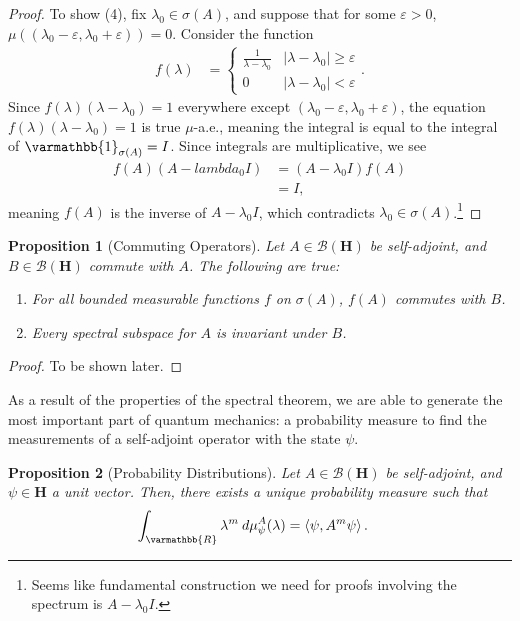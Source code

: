 \documentclass[12pt]{extarticle}
\newcommand{\R}{\varmathbb{R}}
\newcommand{\iprod}[2]{\left\langle #1,#2\right\rangle}
\theoremstyle{plain}
\newtheorem*{proposition}{Proposition}%
\theoremstyle{definition}
\theoremstyle{remark}
\begin{document}
\begin{proof}
    To show (4), fix $\lambda_0\in \sigma(A)$, and suppose that for some $\varepsilon > 0$, $\mu\left((\lambda_0 - \varepsilon, \lambda_0 + \varepsilon)\right) = 0$. Consider the function
    \begin{align*}
      f(\lambda) &= \begin{cases}
        \frac{1}{\lambda - \lambda_0} & \left\vert \lambda - \lambda_0 \right\vert \geq \varepsilon\\
        0 & \left\vert \lambda - \lambda_0 \right\vert < \varepsilon
      \end{cases}.
    \end{align*}
    Since $f(\lambda)\left(\lambda - \lambda_0\right) = 1$ everywhere except $(\lambda_0 - \varepsilon,\lambda_0 + \varepsilon)$, the equation $f(\lambda)\left(\lambda - \lambda_0\right) = 1$ is true $\mu$-a.e., meaning the integral is equal to the integral of $\varmathbb{1}_{\sigma(A)} = I$. Since integrals are multiplicative, we see
    \begin{align*}
      f(A)\left(A - lambda_0 I\right) &= \left(A - \lambda_0 I\right)f(A)\\
                                      &= I,
    \end{align*}
    meaning $f(A)$ is the inverse of $A - \lambda_0 I$, which contradicts $\lambda_0 \in \sigma(A)$.\footnote{Seems like fundamental construction we need for proofs involving the spectrum is $A - \lambda_0 I$.}
  \end{proof}
  \begin{proposition}[Commuting Operators]
    Let $A\in \mathcal{B}\left(\mathbf{H}\right)$ be self-adjoint, and $B\in \mathcal{B}\left(\mathbf{H}\right)$ commute with $A$. The following are true:
    \begin{enumerate}[(1)]
      \item For all bounded measurable functions $f$ on $\sigma(A)$, $f(A)$ commutes with $B$.
      \item Every spectral subspace for $A$ is invariant under $B$.
    \end{enumerate}
  \end{proposition}
  \begin{proof}
    To be shown later.
  \end{proof}
  As a result of the properties of the spectral theorem, we are able to generate the most important part of quantum mechanics: a probability measure to find the measurements of a self-adjoint operator with the state $\psi$.
  \begin{proposition}[Probability Distributions]
    Let $A\in \mathcal{B}\left(\mathbf{H}\right)$ be self-adjoint, and $\psi \in \mathbf{H}$ a unit vector. Then, there exists a unique probability measure such that
    \begin{align*}
      \int_{\R}^{} \lambda^{m}\:d\mu^{A}_{\psi}(\lambda) &= \iprod{\psi}{A^{m}\psi}.
    \end{align*}
  \end{proposition}
\end{document}
